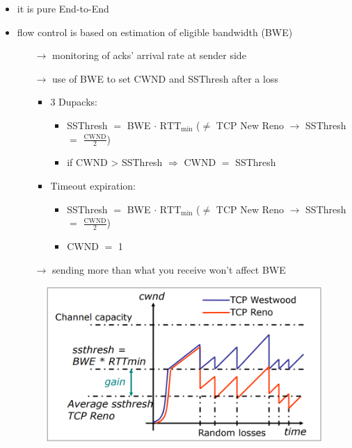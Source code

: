 \begin{itemize}
    \item it is pure End-to-End
    \item flow control is based on estimation of eligible bandwidth (BWE)
    \begin{itemize}
        \item[$\rightarrow$] monitoring of acks' arrival rate at sender side
        \item[$\rightarrow$] use of BWE to set CWND and SSThresh after a loss
        \begin{itemize}
            \item 3 Dupacks:
            \begin{itemize}
                \item SSThresh $=$ BWE $\cdot$ $\text{RTT}_{\text{min}}$
                ($\neq$ TCP New Reno $\rightarrow$ SSThresh $=$ $\frac{\text{CWND}}{\text{2}}$)
                \item if CWND > SSThresh $\Rightarrow$ CWND $=$ SSThresh
            \end{itemize}
            \item Timeout expiration:
            \begin{itemize}
                \item SSThresh $=$ BWE $\cdot$ $\text{RTT}_{\text{min}}$
                ($\neq$ TCP New Reno $\rightarrow$ SSThresh $=$ $\frac{\text{CWND}}{\text{2}}$)
                \item CWND $=$ 1
            \end{itemize}
        \end{itemize}
        \item[$\rightarrow$] sending more than what you receive won't affect BWE
    \end{itemize}
    \begin{figure}[!h] 
        \centering 
        \includegraphics[scale = 0.37]{images/westwood-vs-reno.png} 

\end{figure}
\end{itemize}
